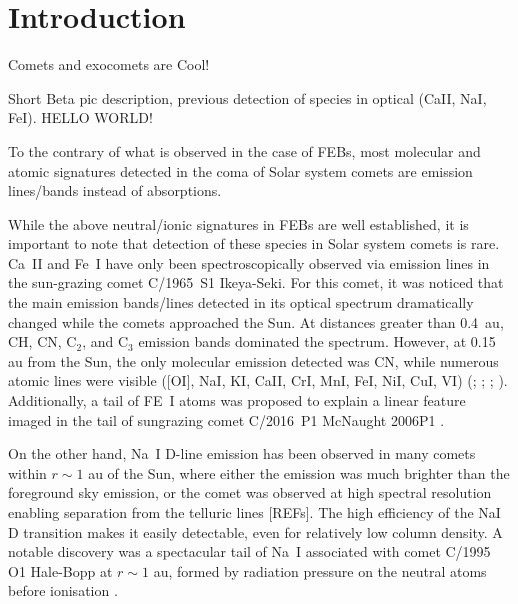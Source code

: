 \documentclass{aa}
\begin{document}
\section{Introduction}

Comets and exocomets are Cool!

Short Beta pic description, previous detection of species in optical (CaII, NaI, FeI). HELLO WORLD!

To the contrary of what is observed in the case of FEBs, most molecular and atomic signatures detected in the coma of Solar system comets are emission lines/bands instead of absorptions.


While the above neutral/ionic signatures in FEBs are well established, it is important to note that detection of these species in Solar system comets is rare. Ca~II and Fe~I have only been spectroscopically observed via emission lines in the sun-grazing comet C/1965~S1 Ikeya-Seki. For this comet, it was noticed that the main emission bands/lines detected in its optical spectrum dramatically changed while the comets approached the Sun. At distances greater than 0.4~au, CH, CN, C$_2$, and C$_3$ emission bands dominated the spectrum. However, at 0.15 au from the Sun, the only molecular emission detected was CN, while numerous atomic lines were visible ([OI], NaI, KI, CaII, CrI, MnI, FeI, NiI, CuI, VI) (\citealp{Dufay65}; \citealp{Thackeray1966}; \citealp{Preston1967}; \citealp{Slaughter1969}).
Additionally, a tail of FE~I atoms was proposed to explain a linear feature imaged in the tail of sungrazing comet C/2016~P1 McNaught 2006P1 \citep{Fulle2007}. 

On the other hand, Na~I D-line emission has been observed in many comets within $r \sim 1$ au of the Sun, where either the emission was much brighter than the foreground sky emission, or the comet was observed at high spectral resolution enabling separation from the telluric lines [REFs]. The high efficiency of the NaI D transition makes it easily detectable, even for relatively low column density. A notable discovery was a spectacular tail of Na~I associated with comet C/1995 O1 Hale-Bopp at $r\sim 1$ au, formed by radiation pressure on the neutral atoms before ionisation \citep{Cremonese1997}. 
\end{document}
